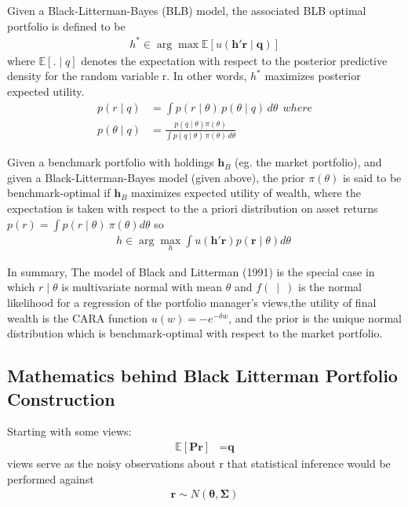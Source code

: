 \documentclass[12pt]{article}
\numberwithin{equation}{section}
\newcommand{\E}{\mathbb{E}}
\begin{document}
Given a Black-Litterman-Bayes (BLB) model, the associated BLB optimal portfolio is defined to be 
\begin{align} 
h^* \in  \arg\max_{}  \E[u(\textbf{h}'\textbf{r}\mid \textbf{q})]
\end{align}
where $\E[ . \mid q]$ denotes the expectation with respect to the posterior predictive density for the random variable r. In other words, $h^*$ maximizes posterior expected utility.
\begin{align} 
p(r \mid q)&= \int p(r \mid \theta)\,p(\theta \mid q)\,d\theta \ \ where \\ 
p(\theta \mid q)&= \frac{p(q\mid \theta) \pi(\theta)}{\int p(q\mid \theta)\,\pi(\theta)\,d\theta}
\end{align}

Given a benchmark portfolio with holdings $\textbf{h}_B$ (eg. the market portfolio), and given a Black-Litterman-Bayes model (given above), the prior $\pi(\theta)$ is said to be benchmark-optimal if $\textbf{h}_B$ maximizes expected utility of wealth, where the expectation is taken with respect to the a priori distribution on asset returns $p(r)=\int p(r \mid \theta)\ \pi(\theta) d\theta$ so
\begin{align} 
h \in  \arg\max_{h}  \int u(\textbf{h}'\textbf{r})p(\textbf{r}\mid\theta)d\theta \
\end{align}

In summary, The model of Black and Litterman (1991) is the special case in which $r \mid \theta$ is multivariate normal with mean $\theta$ and $f(\ \mid \ )$ is the normal likelihood for a regression of the portfolio manager's views,the utility of final wealth is the CARA function $u(w) = -e^{-\delta w}$, and the prior is the unique normal distribution which is benchmark-optimal with respect to the market portfolio.

\subsection{Mathematics behind Black Litterman Portfolio Construction}
Starting with some views:
\begin{align} 
\E[\textbf{Pr}] &= \textbf{q} 
\end{align}
views serve as the noisy observations about r that statistical inference would be performed against
\begin{align} 
\textbf{r} \sim N(\boldsymbol{\theta}, \boldsymbol{\Sigma})
\end{align}
\end{document}

